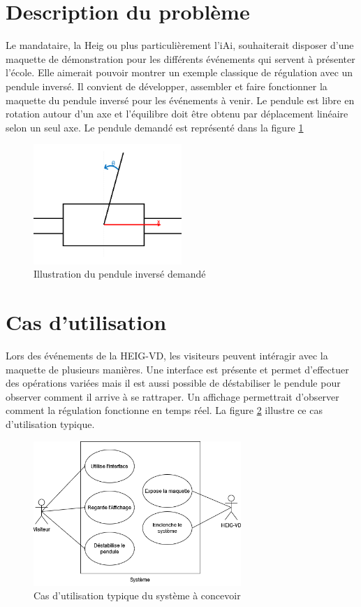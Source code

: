 \section{Description du problème}\label{sec:DescProb}
Le mandataire, la \acrshort{Heig} ou plus particulièrement l'\acrshort{iAi}, souhaiterait disposer d'une maquette de démonstration pour les différents événements qui servent à présenter l'école. Elle aimerait pouvoir montrer un exemple classique de régulation avec un pendule inversé.
Il convient de développer, assembler et faire fonctionner la maquette du pendule inversé pour les événements à venir. Le pendule est libre en rotation autour d'un axe et l'équilibre doit être obtenu par déplacement linéaire selon un seul axe. Le pendule demandé est représenté dans la figure \ref{fig:Illustration}

\begin{figure}[H]
    \centering
    \includegraphics[width = 0.5\textwidth]{assets/figures/IllustrationPendule.png}
    \caption{Illustration du pendule inversé demandé}
    \label{fig:Illustration}
\end{figure}

\section{Cas d'utilisation}\label{sec:CasUtil}
Lors des événements de la HEIG-VD, les visiteurs peuvent intéragir avec la maquette de plusieurs manières. Une interface est présente et permet d'effectuer des opérations variées mais il est aussi possible de déstabiliser le pendule pour observer comment il arrive à se rattraper. Un affichage permettrait d'observer comment la régulation fonctionne en temps réel.
La figure \ref{fig:CasUtil} illustre ce cas d'utilisation typique.

\begin{figure}[H]
    \centering
    \includegraphics[width = 0.7\textwidth]{assets/figures/CasUtil.png}
    \caption{Cas d'utilisation typique  du système à concevoir}
    \label{fig:CasUtil}
\end{figure}

